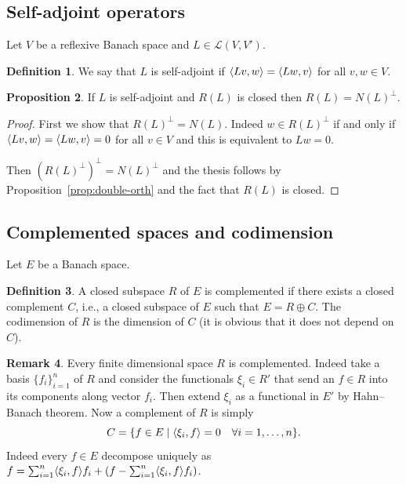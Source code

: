 \documentclass[a4paper,11pt]{article}
\theoremstyle{definition}
\newtheorem{prop}{Proposition}
\newtheorem{defi}[prop]{Definition}
\newtheorem{rmk}[prop]{Remark}
\DeclarePairedDelimiter{\dual}{\langle}{\rangle}
\begin{document}
\subsection{Self-adjoint operators}

Let $V$ be a reflexive Banach space and $L\in\mathscr{L}(V,V')$.

\begin{defi}
We say that $L$ is self-adjoint if $\dual{Lv,w}=\dual{Lw,v}$ for all $v,w\in V$.
\end{defi}

\begin{prop}
\label{prop:range-adj}
If $L$ is self-adjoint and $R(L)$ is closed then $R(L)=N(L)^\perp$.
\end{prop}
\begin{proof}
First we show that $R(L)^\perp=N(L)$. Indeed $w\in R(L)^\perp$ if and only if $\dual{Lv,w}=\dual{Lw,v}=0$ for all $v\in V$ and this is equivalent to $Lw=0$.

Then $(R(L)^\perp)^\perp=N(L)^\perp$ and the thesis follows by Proposition~\ref{prop:double-orth} and the fact that $R(L)$ is closed.
\end{proof}

\subsection{Complemented spaces and codimension}

Let $E$ be a Banach space.
\begin{defi}
A closed subspace $R$ of $E$ is complemented if there exists a closed complement $C$, i.e., a closed subspace of $E$ such that $E=R\oplus C$. The codimension of $R$ is the dimension of $C$ (it is obvious that it does not depend on $C$).
\end{defi}
\begin{rmk}
Every finite dimensional space $R$ is complemented. Indeed take a basis $\{f_i\}_{i=1}^n$ of $R$ and consider the functionals $\xi_i\in R'$ that send an $f\in R$ into its components along vector $f_i$. Then extend $\xi_i$ as a functional in $E'$ by Hahn--Banach theorem. Now a complement of $R$ is simply
\[
C=\{f\in E\;|\;\dual{\xi_i,f}=0\quad\forall i=1,\dots,n\}.
\]
Indeed every $f\in E$ decompose uniquely as $f=\sum_{i=1}^n\dual{\xi_i,f}f_i+(f-\sum_{i=1}^n\dual{\xi_i,f}f_i)$.
\end{rmk}
\end{document}
